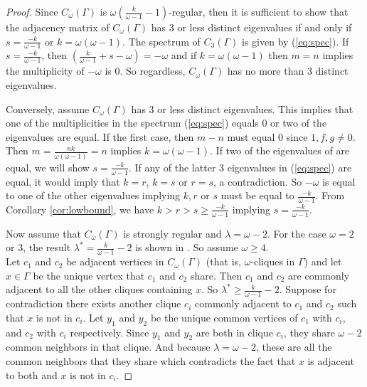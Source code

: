 \documentclass[12pt]{report}
\theoremstyle{definition}
\begin{document}
\begin{proof}
    Since $C_\omega(\Gamma)$ is $\omega(\frac{k}{\omega-1}-1)$-regular, then it is sufficient to show that the adjacency matrix of  $C_\omega(\Gamma)$ has 3 or less distinct eigenvalues if and only if $s = \frac{-k}{\omega-1}$ or $k = \omega(\omega -1)$. The spectrum of $C_3(\Gamma)$ is given by (\ref{eq:spec}). If $s = \frac{-k}{\omega-1}$, then $\left(\frac{k}{\omega-1}+s-\omega\right) =-\omega$ and if $k=\omega(\omega-1)$ then $m=n$  implies the multiplicity of $-\omega$ is 0. So regardless, $C_\omega(\Gamma)$ has no more than 3 distinct eigenvalues.\par
    Conversely, assume $C_\omega(\Gamma)$ has 3 or less distinct eigenvalues. This implies that one of the multiplicities in the spectrum (\ref{eq:spec}) equals 0 or two of the eigenvalues are equal. If the first case, then $m-n$ must equal 0 since $1,f,g \neq 0$. Then $m=\frac{nk}{\omega(\omega-1)}=n$ implies $k=\omega(\omega-1)$. If two of the eigenvalues of are equal, we will show $s=\frac{-k}{\omega-1}$. If any of the latter 3 eigenvalues in (\ref{eq:spec}) are equal, it would imply that $k=r$, $k=s$ or $r=s$, a contradiction. So $-\omega$ is equal to one of the other eigenvalues implying $k, r$ or $s$ must be equal to $\frac{-k}{\omega -1}$. From Corollary \ref{cor:lowbound}, we have $k>r>s \geq \frac{-k}{\omega - 1}$ implying $s=\frac{-k}{\omega -1}$.\par
    Now assume that $C_\omega(\Gamma)$ is strongly regular and $\lambda = \omega -2$. For the case $\omega=2$ or $3$, the result $\lambda^*=\frac{k}{\omega-1}-2$ is shown in \cite[pg. 304]{guest}. So assume $\omega \geq 4$.\\
    Let $c_1$ and $c_2$ be adjacent vertices in $C_\omega(\Gamma)$ (that is,  $\omega$-cliques in $\Gamma$) and let $x \in \Gamma$ be the unique vertex that $c_1$ and $c_2$ share. Then $c_1$ and $c_2$ are commonly adjacent to all the other cliques containing $x$. So $\lambda^* \geq \frac{k}{\omega-1} -2$. Suppose for contradiction there exists another clique $c_i$ commonly adjacent to $c_1$ and $c_2$ such that $x$ is not in $c_i$. Let $y_1$ and $y_2$ be the unique common vertices of $c_1$ with $c_i$, and $c_2$ with $c_i$ respectively. Since $y_1$ and $y_2$ are both in clique $c_i$, they share $\omega -2$ common neighbors in that clique. And because $\lambda=\omega -2$, these are all the common neighbors that they share which contradicts the fact that $x$ is adjacent to both and $x$ is not in $c_i$.

\end{proof}
\end{document}
